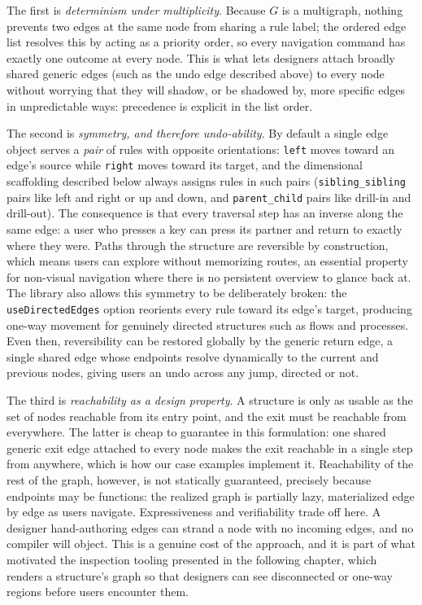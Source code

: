 \documentclass[12pt]{cmuthesis}
\begin{document}
The first is \textit{determinism under multiplicity}. Because $G$ is a multigraph, nothing prevents two edges at the same node from sharing a rule label; the ordered edge list resolves this by acting as a priority order, so every navigation command has exactly one outcome at every node. This is what lets designers attach broadly shared generic edges (such as the undo edge described above) to every node without worrying that they will shadow, or be shadowed by, more specific edges in unpredictable ways: precedence is explicit in the list order.

The second is \textit{symmetry, and therefore undo-ability}. By default a single edge object serves a \textit{pair} of rules with opposite orientations: \texttt{left} moves toward an edge's source while \texttt{right} moves toward its target, and the dimensional scaffolding described below always assigns rules in such pairs (\texttt{sibling\_sibling} pairs like left and right or up and down, and \texttt{parent\_child} pairs like drill-in and drill-out). The consequence is that every traversal step has an inverse along the same edge: a user who presses a key can press its partner and return to exactly where they were. Paths through the structure are reversible by construction, which means users can explore without memorizing routes, an essential property for non-visual navigation where there is no persistent overview to glance back at. The library also allows this symmetry to be deliberately broken: the \texttt{useDirectedEdges} option reorients every rule toward its edge's target, producing one-way movement for genuinely directed structures such as flows and processes. Even then, reversibility can be restored globally by the generic return edge, a single shared edge whose endpoints resolve dynamically to the current and previous nodes, giving users an undo across any jump, directed or not.

The third is \textit{reachability as a design property}. A structure is only as usable as the set of nodes reachable from its entry point, and the exit must be reachable from everywhere. The latter is cheap to guarantee in this formulation: one shared generic exit edge attached to every node makes the exit reachable in a single step from anywhere, which is how our case examples implement it. Reachability of the rest of the graph, however, is not statically guaranteed, precisely because endpoints may be functions: the realized graph is partially lazy, materialized edge by edge as users navigate. Expressiveness and verifiability trade off here. A designer hand-authoring edges can strand a node with no incoming edges, and no compiler will object. This is a genuine cost of the approach, and it is part of what motivated the inspection tooling presented in the following chapter, which renders a structure's graph so that designers can see disconnected or one-way regions before users encounter them.
\end{document}

